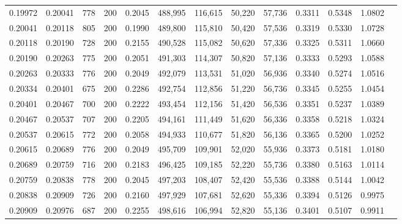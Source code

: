 \begin{tabular}{rrrrrrrrrrrrr}
0.19972 & 0.20041 &    778 & 200 &                                     0.2045 & 488,995 & 116,615 &  50,220 &  57,736 & 0.3311 & 0.5348 & 1.0802 \\
0.20041 & 0.20118 &    805 & 200 &                                     0.1990 & 489,800 & 115,810 &  50,420 &  57,536 & 0.3319 & 0.5330 & 1.0728 \\
0.20118 & 0.20190 &    728 & 200 &                                     0.2155 & 490,528 & 115,082 &  50,620 &  57,336 & 0.3325 & 0.5311 & 1.0660 \\
0.20190 & 0.20263 &    775 & 200 &                                     0.2051 & 491,303 & 114,307 &  50,820 &  57,136 & 0.3333 & 0.5293 & 1.0588 \\
0.20263 & 0.20333 &    776 & 200 &                                     0.2049 & 492,079 & 113,531 &  51,020 &  56,936 & 0.3340 & 0.5274 & 1.0516 \\
0.20334 & 0.20401 &    675 & 200 &                                     0.2286 & 492,754 & 112,856 &  51,220 &  56,736 & 0.3345 & 0.5255 & 1.0454 \\
0.20401 & 0.20467 &    700 & 200 &                                     0.2222 & 493,454 & 112,156 &  51,420 &  56,536 & 0.3351 & 0.5237 & 1.0389 \\
0.20467 & 0.20537 &    707 & 200 &                                     0.2205 & 494,161 & 111,449 &  51,620 &  56,336 & 0.3358 & 0.5218 & 1.0324 \\
0.20537 & 0.20615 &    772 & 200 &                                     0.2058 & 494,933 & 110,677 &  51,820 &  56,136 & 0.3365 & 0.5200 & 1.0252 \\
0.20615 & 0.20689 &    776 & 200 &                                     0.2049 & 495,709 & 109,901 &  52,020 &  55,936 & 0.3373 & 0.5181 & 1.0180 \\
0.20689 & 0.20759 &    716 & 200 &                                     0.2183 & 496,425 & 109,185 &  52,220 &  55,736 & 0.3380 & 0.5163 & 1.0114 \\
0.20759 & 0.20838 &    778 & 200 &                                     0.2045 & 497,203 & 108,407 &  52,420 &  55,536 & 0.3388 & 0.5144 & 1.0042 \\
0.20838 & 0.20909 &    726 & 200 &                                     0.2160 & 497,929 & 107,681 &  52,620 &  55,336 & 0.3394 & 0.5126 & 0.9975 \\
0.20909 & 0.20976 &    687 & 200 &                                     0.2255 & 498,616 & 106,994 &  52,820 &  55,136 & 0.3401 & 0.5107 & 0.9911 \\

\end{tabular}
